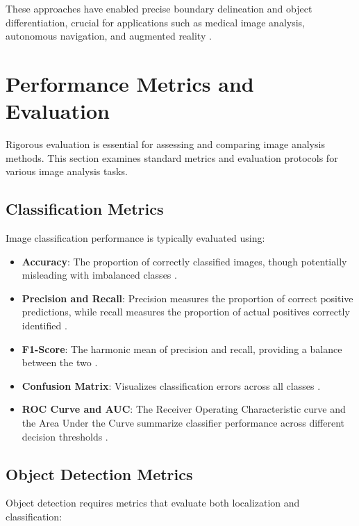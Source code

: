 These approaches have enabled precise boundary delineation and object differentiation, crucial for applications such as medical image analysis, autonomous navigation, and augmented reality \cite{minaee2021image}.

\section{Performance Metrics and Evaluation}
Rigorous evaluation is essential for assessing and comparing image analysis methods. This section examines standard metrics and evaluation protocols for various image analysis tasks.

\subsection{Classification Metrics}
Image classification performance is typically evaluated using:

\begin{itemize}
    \item \textbf{Accuracy}: The proportion of correctly classified images, though potentially misleading with imbalanced classes \cite{sokolova2009systematic}.
    
    \item \textbf{Precision and Recall}: Precision measures the proportion of correct positive predictions, while recall measures the proportion of actual positives correctly identified \cite{davis2006relationship}.
    
    \item \textbf{F1-Score}: The harmonic mean of precision and recall, providing a balance between the two \cite{van1979information}.
    
    \item \textbf{Confusion Matrix}: Visualizes classification errors across all classes \cite{stehman1997selecting}.
    
    \item \textbf{ROC Curve and AUC}: The Receiver Operating Characteristic curve and the Area Under the Curve summarize classifier performance across different decision thresholds \cite{fawcett2006introduction}.
\end{itemize}

\subsection{Object Detection Metrics}
Object detection requires metrics that evaluate both localization and classification:

